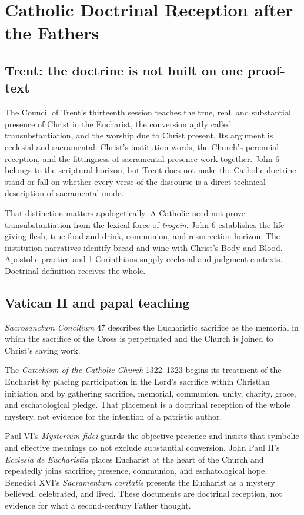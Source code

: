 \section{Catholic Doctrinal Reception after the Fathers}

\subsection{Trent: the doctrine is not built on one proof-text}

The Council of Trent's thirteenth session teaches the true, real, and
substantial presence of Christ in the Eucharist, the conversion aptly called
transubstantiation, and the worship due to Christ present. Its argument is
ecclesial and sacramental: Christ's institution words, the Church's perennial
reception, and the fittingness of sacramental presence work together. John 6
belongs to the scriptural horizon, but Trent does not make the Catholic doctrine
stand or fall on whether every verse of the discourse is a direct technical
description of sacramental mode.

That distinction matters apologetically. A Catholic need not prove
transubstantiation from the lexical force of \emph{tr\=ogein}. John 6 establishes
the life-giving flesh, true food and drink, communion, and resurrection horizon.
The institution narratives identify bread and wine with Christ's Body and
Blood. Apostolic practice and 1 Corinthians supply ecclesial and judgment
contexts. Doctrinal definition receives the whole.

\subsection{Vatican II and papal teaching}

\emph{Sacrosanctum Concilium} 47 describes the Eucharistic sacrifice as the
memorial in which the sacrifice of the Cross is perpetuated and the Church is
joined to Christ's saving work.

The \emph{Catechism of the Catholic Church} 1322--1323 begins its treatment of
the Eucharist by placing participation in the Lord's sacrifice within Christian
initiation and by gathering sacrifice, memorial, communion, unity, charity,
grace, and eschatological pledge. That placement is a doctrinal reception of
the whole mystery, not evidence for the intention of a patristic author.

Paul VI's \emph{Mysterium fidei} guards the objective presence and insists that
symbolic and effective meanings do not exclude substantial conversion. John
Paul II's \emph{Ecclesia de Eucharistia} places Eucharist at the heart of the
Church and repeatedly joins sacrifice, presence, communion, and eschatological
hope. Benedict XVI's \emph{Sacramentum caritatis} presents the Eucharist as a
mystery believed, celebrated, and lived. These documents are doctrinal
reception, not evidence for what a second-century Father thought.

